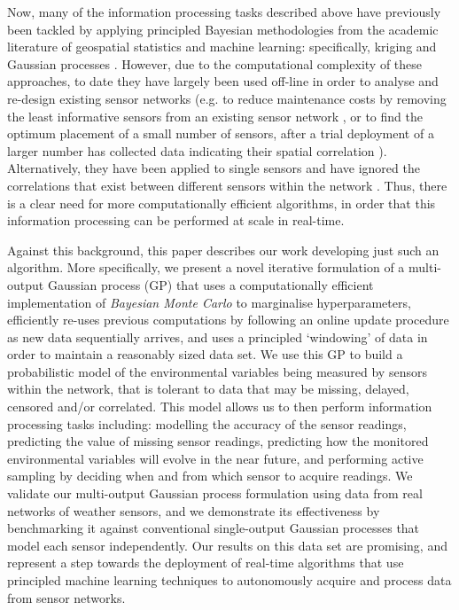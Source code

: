 \documentclass{acmtrans2m}
\begin{document}
Now, many of the information processing tasks described above have previously been tackled by applying principled Bayesian methodologies from the academic literature of geospatial statistics and machine learning: specifically, kriging \cite{cressie} and Gaussian processes \cite{GPsBook}. However, due to the computational complexity of these approaches, to date they have largely been used off-line in order to analyse and re-design existing sensor networks (e.g. to reduce maintenance costs by removing the least informative sensors from an existing sensor network \cite{fuentes}, or to find the optimum placement of a small number of sensors, after a trial deployment of a larger number has collected data indicating their spatial correlation \cite{guestrin1}). Alternatively, they have been applied to single sensors and have ignored the correlations that exist between different sensors within the network \cite{1525857,usac}. Thus, there is a clear need for more computationally efficient algorithms, in order that this information processing can be performed at scale in real-time.

Against this background, this paper describes our work developing just such an algorithm. More specifically, we present a novel iterative formulation of a multi-output Gaussian process (GP) that uses a computationally efficient implementation of {\em Bayesian Monte Carlo} to marginalise hyperparameters, efficiently re-uses previous computations by following an online update procedure as new data sequentially arrives, and uses a principled `windowing' of data in order to maintain a reasonably sized data set. We use this GP to build a probabilistic model of the environmental variables being measured by sensors within the network, that is tolerant to data that may be missing, delayed, censored and/or correlated. This model allows us to then perform information processing tasks including: modelling the accuracy of the sensor readings, predicting the value of missing sensor readings, predicting how the monitored environmental variables will evolve in the near future, and performing active sampling by deciding when and from which sensor to acquire readings. We validate our multi-output Gaussian process formulation using data from real networks of weather sensors, and we demonstrate its effectiveness by benchmarking it against conventional single-output Gaussian processes that model each sensor independently. Our results on this data set are promising, and represent a step towards the deployment of real-time algorithms that use principled machine learning techniques to autonomously acquire and process data from sensor networks.
\end{document}
